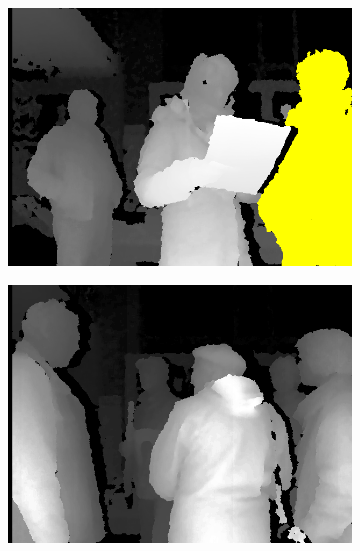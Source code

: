 \begin{figure}[H]
    \centering
    \begin{subfigure}[H]{0.3\textwidth}
        \centering
        \includegraphics[width=\textwidth]{Figures/8/non_inter_findings/effects/neglegance}
        \caption{}
        \label{fig:non-blindness}
    \end{subfigure}
    \hfill
    \begin{subfigure}[H]{0.3\textwidth}
        \centering
        \includegraphics[width=\textwidth]{Figures/8/non_inter_findings/effects/displayblindness}
        \caption{}
        \label{fig:non-negligence}
    \end{subfigure}
    \hfill
    \begin{subfigure}[H]{0.3\textwidth}

\end{subfigure}
\end{figure}
